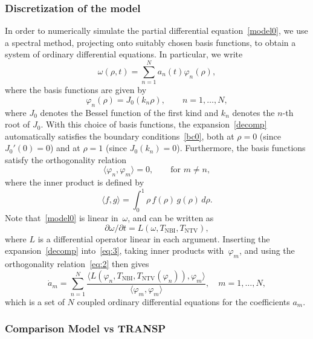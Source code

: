\documentclass[12pt,lot, lof]{puthesis}
\begin{document}
\subsubsection{Discretization of the model}
In order to numerically simulate the partial differential equation~\eqref{model0}, we use a spectral method, projecting onto suitably chosen basis functions, to obtain a system of ordinary differential equations.  In particular, we write
\begin{equation}
\omega(\rho,t)  = \sum_{n=1}^{N} a_n(t) \varphi_n(\rho),
\label{decomp}
\end{equation}
where the basis functions are given by
\begin{equation}
  \label{eq:1}
  \varphi_n(\rho) = J_0(k_n\rho),\qquad n=1,\ldots,N,
\end{equation}
where $J_0$ denotes the Bessel function of the first kind and $k_n$ denotes the $n$-th root of $J_0$.  With this choice of basis functions, the expansion~\eqref{decomp} automatically satisfies the boundary conditions~\eqref{bc0}, both at $\rho=0$ (since $J_0'(0)=0$) and at $\rho=1$ (since $J_0(k_n)=0$).  Furthermore, the basis functions satisfy the orthogonality relation
\begin{equation}
  \label{eq:2}
  \langle \varphi_n,\varphi_m\rangle = 0,\qquad \text{for $m\ne n$},
\end{equation}
where the inner product is defined by
\begin{equation*}
\langle f,g \rangle =   \int^1 _0 \rho \, f(\rho) \, g(\rho) \, d\rho.
\end{equation*}
Note that~\eqref{model0} is linear in~$\omega$, and can be written as
\begin{equation}
\label{eq:3}
\partial \omega/\partial t=L(\omega,T_\text{NBI},T_\text{NTV}),
\end{equation}
where $L$ is a differential operator linear in each argument.  Inserting the expansion~\eqref{decomp} into~\eqref{eq:3}, taking inner products with~$\varphi_m$, and using the orthogonality relation~\eqref{eq:2} then gives
\begin{equation*}
  \dot a_m = \sum_{n=1}^N \frac{\langle L(\varphi_n, T_\text{NBI}, T_\text{NTV}(\varphi_n)),
    \varphi_m\rangle}{\langle \varphi_m,\varphi_m\rangle},\quad m=1,\ldots,N,
\end{equation*}
which is a set of $N$ coupled ordinary differential equations for the coefficients $a_m$.

\subsubsection{Comparison Model vs TRANSP}
\end{document}
